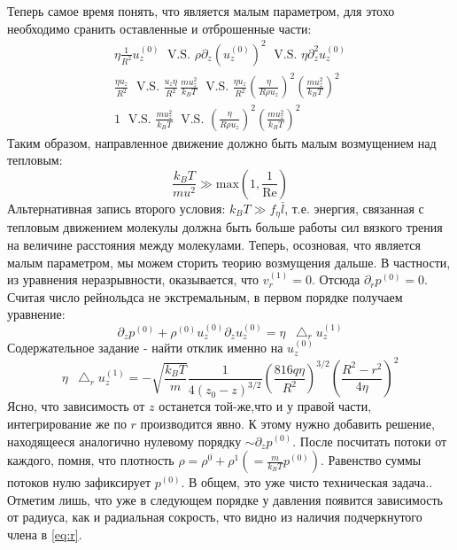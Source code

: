 \documentclass[a4paper,12pt]{article}
\newcommand*\Laplace{\mathop{}\!\mathbin\bigtriangleup}
\theoremstyle{plain} %
\theoremstyle{definition} %
\theoremstyle{remark} %
\begin{document}
Теперь самое время понять, что является малым параметром, для этохо необходимо сранить оставленные и отброшенные части:
\begin{eqnarray}
    \eta \frac{1}{R^2} u_z^{(0)} \; \text{    V.S.   } \rho \partial_z (u_z^{(0)})^{2} \;   \text{    V.S.   } \eta \partial_z^2 u_z^{(0)} \\
   \frac{\eta u_z}{R^2}  \; \text{    V.S.   } \frac{u_z \eta}{R^2}\, \frac{m u_z^2}{k_B T} \;   \text{    V.S.   } \frac{\eta u_z}{R^2} \left(\frac{\eta}{R\rho u_z}\right)^2 \left(\frac{m u_z^2 }{k_B T}\right)^2\\
    1 \; \text{    V.S.   } \frac{m u_z^2}{k_B T} \;   \text{    V.S.   } \left(\frac{\eta}{R\rho u_z}\right)^2 \left(\frac{m u_z^2 }{k_B T}\right)^2
\end{eqnarray}
Таким образом, направленное движение должно быть малым возмущением над тепловым:
\begin{equation}
    \frac{k_B T}{m u^2} \gg \text{max}\left(1, \frac{1}{\text{Re}}\right)
\end{equation}
Альтернативная запись второго условия: $k_B T \gg f_{\eta} \bar{l}$, т.е. энергия, связанная с тепловым движением молекулы должна быть больше работы сил вязкого трения на величине расстояния между молекулами.
Теперь, осозновая, что является малым параметром, мы можем сторить теорию возмущения дальше. 
В частности, из уравнения неразрывности, оказывается, что $v_r^{(1)} = 0$. Отсюда $\partial_r p^{(0)} = 0$.
Считая число рейнольдса не экстремальным, в первом порядке получаем уравнение:
\begin{equation}
    \partial_z p^{(0)}+ \rho^{(0)}u_z^{(0)}\partial_z u_z^{(0)} = \eta \Laplace_r u_z^{(1)}
\end{equation}
Содержательное задание - найти отклик именно на $u_z^{(0)}$
\begin{equation}
    \eta\Laplace_r u_z^{(1)} = - \sqrt{\frac{k_B T}{m}} \frac{1}{4(z_0-z)^{3/2}} \left(\frac{816q\eta}{R^2}\right)^{3/2} \left(\frac{R^2-r^2}{4\eta}\right)^2
\end{equation}
Ясно, что зависимость от $z$ останется той-же,что и у правой части, интегрирование же по $r$ производится явно. К этому нужно добавить решение, находящееся аналогично нулевому порядку $\sim \partial_z p^{(0)}$.
После посчитать потоки от каждого, помня, что плотность $\rho = \rho^{0} + \rho^{1}(= \frac{m}{k_B T} p^{(0)})$.
Равенство суммы потоков нулю зафиксирует $p^{(0)}$.
В общем, это уже чисто техническая задача..
Отметим лишь, что уже в следующем порядке у давления появится зависимость от радиуса, как и радиальная сокрость, что видно из наличия подчеркнутого члена в \eqref{eq:r}.
\end{document}

